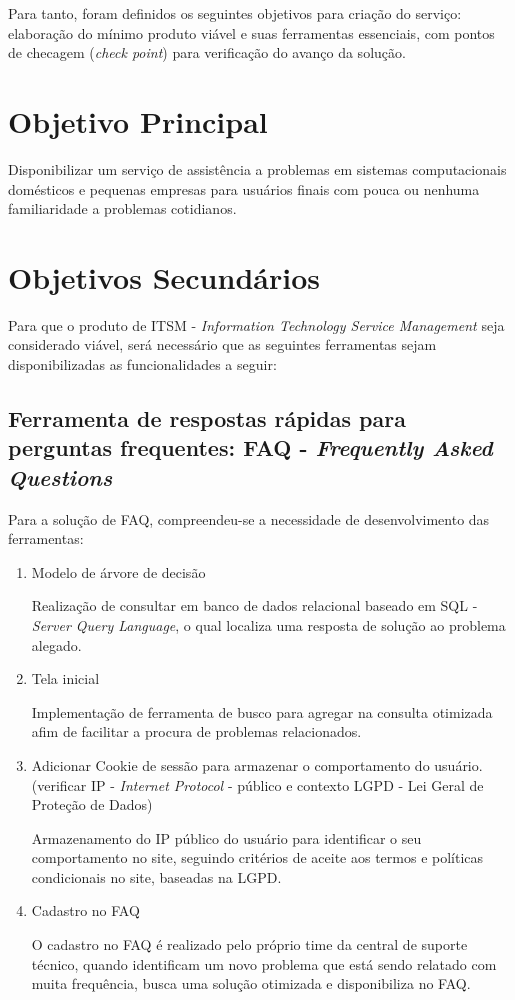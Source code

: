 Para tanto, foram definidos os seguintes objetivos para criação do serviço: elaboração do mínimo produto viável e suas ferramentas essenciais, com pontos de checagem (\textit{check point}) para verificação do avanço da solução.

\section{Objetivo Principal}

Disponibilizar um serviço de assistência a problemas em sistemas computacionais domésticos e pequenas empresas para usuários finais com pouca ou nenhuma familiaridade a problemas cotidianos.

\section{Objetivos Secundários}

Para que o produto de ITSM - \textit{Information Technology Service Management} seja considerado viável, será necessário que as seguintes ferramentas sejam disponibilizadas as funcionalidades a seguir: 

\subsection{Ferramenta de respostas rápidas para perguntas frequentes: FAQ - \textit{Frequently Asked Questions}}

Para a solução de FAQ, compreendeu-se a necessidade de desenvolvimento das ferramentas:

\begin{enumerate}
	\item Modelo de árvore de decisão
	
	Realização de consultar em banco de dados relacional baseado em SQL - \textit{Server Query Language}, o qual localiza uma resposta de solução ao problema alegado.
	
	\item Tela inicial
	
	Implementação de ferramenta de busco para agregar na consulta otimizada afim de facilitar a procura de problemas relacionados.
	
	\item Adicionar Cookie de sessão para armazenar o comportamento do usuário. (verificar IP - \textit{Internet Protocol} - público e contexto LGPD - Lei Geral de Proteção de Dados)
	
	Armazenamento do IP público do usuário para identificar o seu comportamento no site, seguindo critérios de aceite aos termos e políticas condicionais no site, baseadas na LGPD.
	
	\item Cadastro no FAQ
	
	O cadastro no FAQ é realizado pelo próprio time da central de suporte técnico, quando identificam um novo problema que está sendo relatado com muita frequência, busca uma solução otimizada e disponibiliza no FAQ. 
\end{enumerate}

